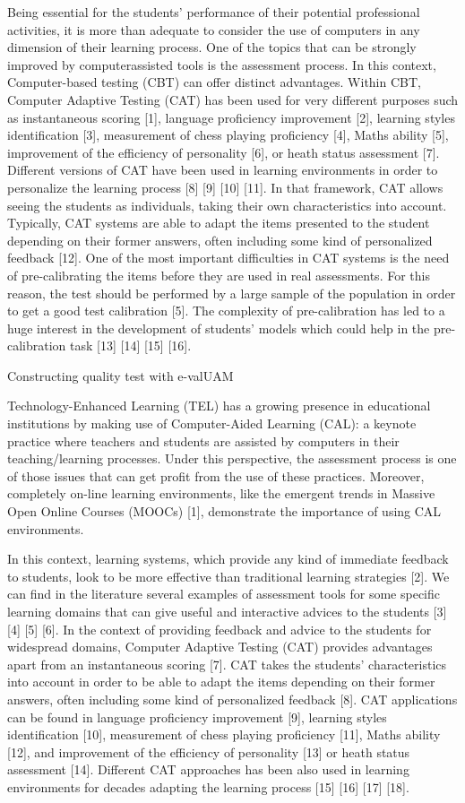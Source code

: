 Being essential for the students’ performance of their potential professional activities, it is more than adequate to consider the
use of computers in any dimension of their learning process. One of the topics that can be strongly improved by computerassisted
tools is the assessment process. In this context, Computer-based testing (CBT) can offer distinct advantages. Within
CBT, Computer Adaptive Testing (CAT) has been used for very different purposes such as instantaneous scoring [1],
language proficiency improvement [2], learning styles identification [3], measurement of chess playing proficiency [4], Maths
ability [5], improvement of the efficiency of personality [6], or heath status assessment [7]. Different versions of CAT have
been used in learning environments in order to personalize the learning process [8] [9] [10] [11]. In that framework, CAT
allows seeing the students as individuals, taking their own characteristics into account. Typically, CAT systems are able to
adapt the items presented to the student depending on their former answers, often including some kind of personalized
feedback [12].
One of the most important difficulties in CAT systems is the need of pre-calibrating the items before they are used in real
assessments. For this reason, the test should be performed by a large sample of the population in order to get a good test
calibration [5]. The complexity of pre-calibration has led to a huge interest in the development of students’ models which
could help in the pre-calibration task [13] [14] [15] [16].


Constructing quality test with e-valUAM

Technology-Enhanced Learning (TEL) has a growing presence in educational institutions by making use of Computer-Aided Learning (CAL): a keynote practice where teachers and students are assisted by computers in their teaching/learning processes. Under this perspective, the assessment process is one of those issues that can get profit from the use of these practices. Moreover, completely on-line learning environments, like the emergent trends in Massive Open Online Courses (MOOCs) [1], demonstrate the importance of using CAL environments.

In this context, learning systems, which provide any kind of immediate feedback to students, look to be more effective than traditional learning strategies [2]. We can find in the literature several examples of assessment tools for some specific learning domains that can give useful and interactive advices to the students [3] [4] [5] [6]. In the context of providing feedback and advice to the students for widespread domains, Computer Adaptive Testing (CAT) provides advantages apart from an instantaneous scoring [7]. CAT takes the students' characteristics into account in order to be able to adapt the items depending on their former answers, often including some kind of personalized feedback [8]. CAT applications can be found in language proficiency improvement [9], learning styles identification [10], measurement of chess playing proficiency [11], Maths ability [12], and improvement of the efficiency of personality [13] or heath status assessment [14]. Different CAT approaches has been also used in learning environments for decades adapting the learning process [15] [16] [17] [18].

